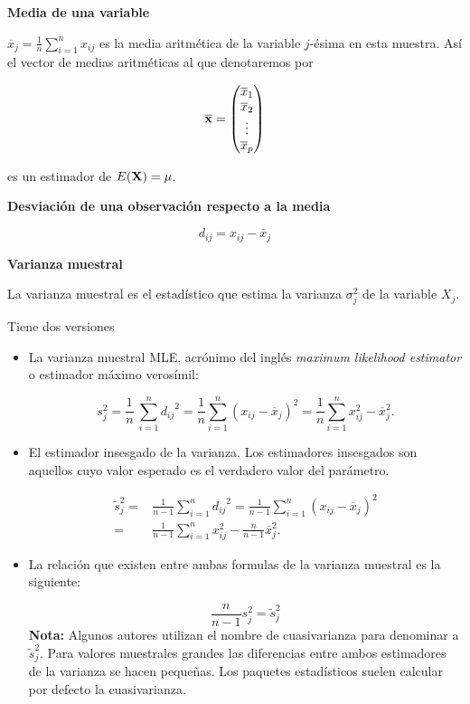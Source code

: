 \begin{frame}
\textbf{Media de una variable}

$\overline{{x}}_j=\frac{1}{n}\sum\limits_{i=1}^n x_{i j}$ es la media aritmética de la variable $j$-ésima en esta muestra.
Así el vector de medias aritméticas al que denotaremos por

$$\overline{\mathbf{x}}=\begin{pmatrix}\overline{{x}}_1 \\\overline{{x}}_2\\\vdots\\ \overline{{x}}_p\end{pmatrix}$$

es un estimador de $E(\mathbf{X})=\mathbf{\mu}$.

\textbf{Desviación de una observación respecto a la media}

$$d_{i j}=x_{i j}-\overline{{x}}_{j}$$

\end{frame}
\begin{frame}
\textbf{Varianza muestral}
 
La varianza muestral es el estadístico que estima la varianza $\sigma_j^2$ de la variable $X_j$.
 
Tiene dos versiones
\begin{itemize}
\item La varianza muestral MLE, acrónimo del inglés \textsl{maximum likelihood estimator} o estimador máximo verosímil:

$$s_j^2=\frac{1}{n}\
\sum_{i=1}^n {d_{i j}}^2=\frac{1}{n}\sum_{i=1}^n {(x_{i j}-\overline{{x}}_{j})^2}=\frac{1}{n}
\sum_{i=1}^n{x_{i j}^2}-\overline{{x}}_{j}^2.$$


\end{itemize}
\end{frame}
\begin{frame}

\begin{itemize}
\item El estimador insesgado de la varianza. Los estimadores insesgados son aquellos cuyo valor esperado es el verdadero valor del parámetro.

$$
\begin{array}{rl}
\tilde{s}_j^2= & \frac{1}{n-1}
\sum_{i=1}^n{d_{i j}}^2 =\frac{1}{n-1}\sum_{i=1}^n{(x_{i j}-\overline{{x}}_{j})^2}\\ = & \frac{1}{n-1}
\sum_{i=1}^n{x_{i j}^2}-\frac{n}{n-1}\overline{{x}}_{j}^2.
\end{array}$$

\item  La relación que existen entre ambas formulas de la varianza muestral es la siguiente:

$$\frac{n}{n-1}s_j^2=\tilde{s}_j^2$$
\textbf{Nota:} Algunos autores utilizan el nombre de cuasivarianza para denominar a $\tilde{s}_j^2$. Para valores muestrales grandes las diferencias  entre ambos estimadores de la varianza se hacen pequeñas.
Los paquetes estadísticos suelen calcular por defecto la  cuasivarianza.
\end{itemize}

\end{frame}
